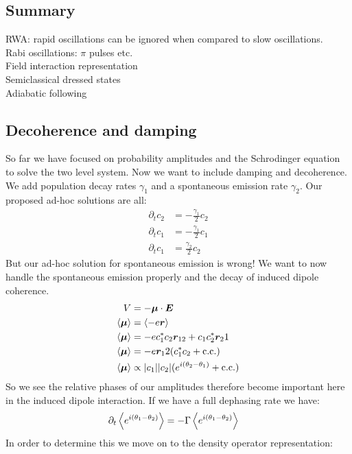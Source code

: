\subsection{Summary}
RWA: rapid oscillations can be ignored when compared to slow oscillations.\\
Rabi oscillations: $\pi$ pulses etc. \\
Field interaction representation \\
Semiclassical dressed states \\
Adiabatic following \\
\subsection{Decoherence and damping}
So far we have focused on probability amplitudes and the Schrodinger equation to solve the two level system. Now we want to include damping and decoherence. We add population decay rates $\gamma_1$ and a spontaneous emission rate $\gamma_2$. Our proposed ad-hoc solutions are all:
\begin{align*}
	\partial_t c_2 &= -\frac{\gamma_1}{2} c_2  \\
	\partial_t c_1 &= -\frac{\gamma_1}{2} c_1 \\
	\partial_t c_1 &= \frac{\gamma_2}{2} c_2
\end{align*}
But our ad-hoc solution for spontaneous emission is wrong! We want to now handle the spontaneous emission properly and the decay of induced dipole coherence. 
\begin{align*}
	V &= -\bm{\mu}\cdot \bm{E} \\
	\expval{\bm{\mu}} &= \expval{-e\bm{r}} \\
	\expval{\bm{\mu}} &= -ec_1^*c_2\bm{r}_{12} + c_1c_2^*\bm{r}_21 \\
	\expval{\bm{\mu}} &= -e\bm{r}_12 (c_1^*c_2 + \text{c.c.}) \\
	\expval{\bm{\mu}} &\propto |c_1||c_2|(e^{i(\theta_2 - \theta_1)} + \text{c.c.})
\end{align*}
So we see the relative phases of our amplitudes therefore become important here in the induced dipole interaction. If we have a full dephasing rate we have:
\begin{align*}
	\partial_t \expval{e^{i(\theta_1 - \theta_2)}} &= -\Gamma\expval{e^{i(\theta_1 - \theta_2)}} 
\end{align*}
In order to determine this we move on to the density operator representation:
